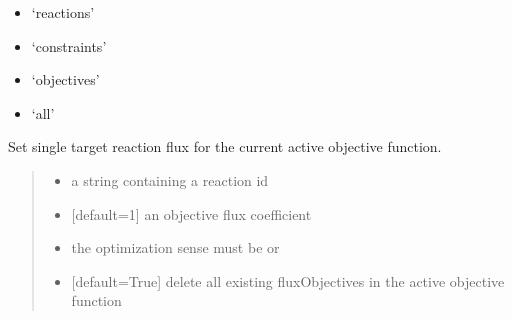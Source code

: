 \documentclass[letterpaper,12pt,english]{sphinxmanual}
\begin{document}
\begin{fulllineitems}
\begin{fulllineitems}
\begin{itemize}
\item {} 
\sphinxAtStartPar
‘reactions’

\item {} 
\sphinxAtStartPar
‘constraints’

\item {} 
\sphinxAtStartPar
‘objectives’

\item {} 
\sphinxAtStartPar
‘all’

\end{itemize}

\end{fulllineitems}


\begin{fulllineitems}
\label{\detokenize{api/core:cbmpy.CBModel.Model.setObjectiveFlux}}
\pysigstartsignatures
\pysiglinewithargsret
{}
{\sphinxparamcomma {}\sphinxparamcomma {}\sphinxparamcomma {}}
{}
\pysigstopsignatures
\sphinxAtStartPar
Set single target reaction flux for the current active objective function.
\begin{quote}\begin{description}
\begin{itemize}
\item {} 
\sphinxAtStartPar
{} \textendash{} a string containing a reaction id

\item {} 
\sphinxAtStartPar
{} \textendash{} {[}default=1{]} an objective flux coefficient

\item {} 
\sphinxAtStartPar
{} \textendash{} the optimization sense must be  or 

\item {} 
\sphinxAtStartPar
{} \textendash{} {[}default=True{]} delete all existing fluxObjectives in the active objective function


\end{itemize}
\end{description}
\end{quote}
\end{fulllineitems}
\end{fulllineitems}
\end{document}
